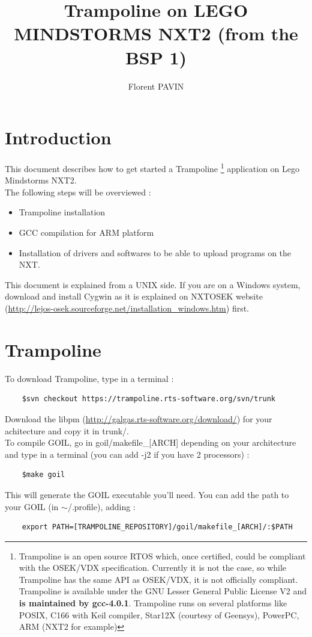 \documentclass[10pt]{article}
\title{Trampoline on LEGO MINDSTORMS NXT2 (from the BSP 1)}
\author{Florent PAVIN}
\begin{document}
\maketitle
\tableofcontents

\newpage

\section{Introduction}
This document describes how to get started a Trampoline \footnote{Trampoline is an open source RTOS which, once certified, could be compliant with the OSEK/VDX specification. Currently it is not the case, so while Trampoline has the same API as OSEK/VDX, it is not officially compliant. Trampoline is available under the GNU Lesser General Public License V2 and \textbf{is maintained by gcc-4.0.1}. Trampoline runs on several platforms like POSIX, C166 with Keil compiler, Star12X (courtesy of Geensys), PowerPC, ARM (NXT2 for example)} application on Lego Mindstorms NXT2.\\
The following steps will be overviewed :
\begin{itemize}
\item Trampoline installation
\item GCC compilation for ARM platform
\item Installation of drivers and softwares to be able to upload programs on the NXT.
\end{itemize}
This document is explained from a UNIX side. If you are on a Windows system, download and install Cygwin as it is explained on NXTOSEK website (\href{http://lejos-osek.sourceforge.net/installation_windows.htm}{http://lejos-osek.sourceforge.net/installation\_windows.htm}) first.

\section{Trampoline}
To download Trampoline, type in a terminal :
	\begin{verbatim}
	$svn checkout https://trampoline.rts-software.org/svn/trunk
	\end{verbatim}
Download the libpm (\href{http://galgas.rts-software.org/download/}{http://galgas.rts-software.org/download/}) for your achitecture and copy it in trunk/.\\
To compile GOIL, go in goil/makefile\_[ARCH] depending on your architecture and type in a terminal (you can add -j2 if you have 2 processors) :
	\begin{verbatim}
	$make goil
	\end{verbatim}
This will generate the GOIL executable you'll need. You can add the path to your GOIL (in $\sim$/.profile), adding :
	\begin{verbatim}
	export PATH=[TRAMPOLINE_REPOSITORY]/goil/makefile_[ARCH]/:$PATH
	\end{verbatim}
\end{document}
